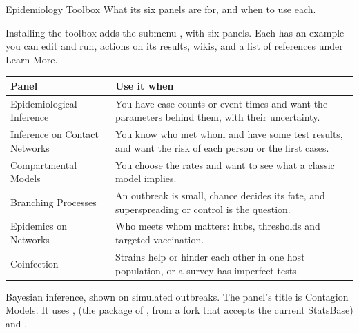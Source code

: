 
\renewcommand{\vignetteauthor}{Pollis}
\renewcommand{\vignettedate}{31 October 2026}
\renewcommand{\vignettelicense}{AGPL-3.0}



  {Epidemiology Toolbox}
  {What its six panels are for, and when to use each.}

Installing the toolbox adds the submenu , with six panels. Each has an example you can edit and run, actions on its results, wikis, and a list of references under Learn More.

\medskip
{\small
\begin{tabularx}{\linewidth}{@{}>{\raggedright\arraybackslash}p{62mm}X@{}}
\toprule
\textbf{Panel} & \textbf{Use it when} \\\midrule
Epidemiological Inference & You have case counts or event times and want the parameters behind them, with their uncertainty. \\
Inference on Contact Networks & You know who met whom and have some test results, and want the risk of each person or the first cases. \\
Compartmental Models & You choose the rates and want to see what a classic model implies. \\
Branching Processes & An outbreak is small, chance decides its fate, and superspreading or control is the question. \\
Epidemics on Networks & Who meets whom matters: hubs, thresholds and targeted vaccination. \\
Coinfection & Strains help or hinder each other in one host population, or a survey has imperfect tests. \\\bottomrule
\end{tabularx}}


Bayesian inference, shown on simulated outbreaks. The panel's title is Contagion Models. It uses ,  (the package of , from a fork that accepts the current StatsBase) and .

